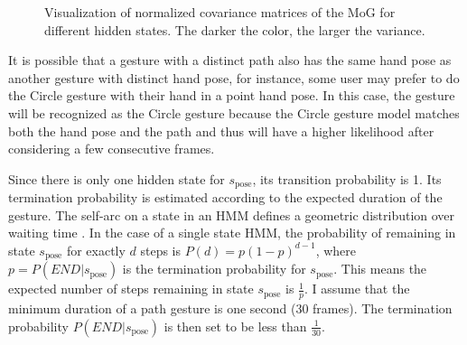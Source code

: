 \begin{figure}[tbh]
\centering
{}
\caption{Visualization of normalized covariance matrices of the MoG for
different hidden states. The darker the color, the larger the variance.}
\label{fig:covariance}
\end{figure}

It is possible that a gesture with a distinct path also has the same hand pose
as another gesture with distinct hand pose, for instance, some user may prefer
to do the Circle gesture with their hand in a point hand pose. In this case, the
gesture will be recognized as the Circle gesture because the Circle gesture
model matches both the hand pose and the path and thus will 
have a higher likelihood after considering a few consecutive frames.

Since there is only one hidden state for $s_{\text{pose}}$, its transition
probability is 1. Its termination probability is estimated according to the
expected duration of the gesture. The self-arc on a state in an HMM defines a 
geometric distribution over waiting time \cite{murphy02}. In the case of a
single state HMM, the probability of remaining in state $s_{\text{pose}}$ for
exactly $d$ steps is $P(d) = p(1-p)^{d - 1}$, where $p = P(END|s_\text{pose})$
is the termination probability for $s_{\text{pose}}$. This means the expected
number of steps remaining in state $s_{\text{pose}}$ is $\frac{1}{p}$. I assume
that the minimum duration of a path gesture is one
second (30 frames). The termination probability $P(END|s_\text{pose})$ is then set to
be less than $\frac{1}{30}$.

